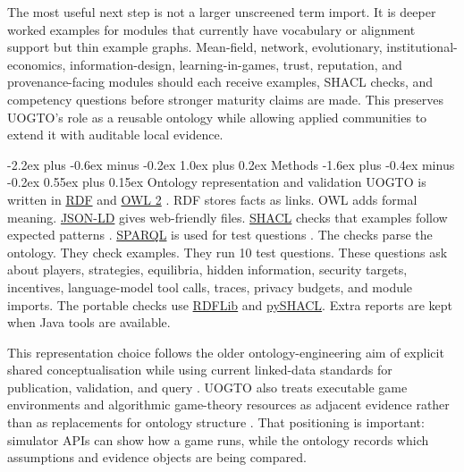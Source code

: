 \documentclass[11pt]{article}
\makeatletter
\renewcommand\section{\@startsection{section}{1}{\z@}%
  {-2.2ex plus -0.6ex minus -0.2ex}%
  {1.0ex plus 0.2ex}%
  {\normalfont\Large\bfseries\color{uogtoInk}}}
\renewcommand\subsection{\@startsection{subsection}{2}{\z@}%
  {-1.6ex plus -0.4ex minus -0.2ex}%
  {0.55ex plus 0.15ex}%
  {\normalfont\large\bfseries\color{uogtoInk}}}
\newcommand{\abblink}[2]{\hyperlink{abbr:#1}{#2}}
\makeatother
\begin{document}
The most useful next step is not a larger unscreened term import. It is deeper worked examples for modules that currently have vocabulary or alignment support but thin example graphs. Mean-field, network, evolutionary, institutional-economics, information-design, learning-in-games, trust, reputation, and provenance-facing modules should each receive examples, SHACL checks, and competency questions before stronger maturity claims are made. This preserves UOGTO's role as a reusable ontology while allowing applied communities to extend it with auditable local evidence.

\section{Methods}
\subsection{Ontology representation and validation}
UOGTO is written in \abblink{rdf}{RDF} and \abblink{owl}{OWL 2} \cite{w3c-rdf11-concepts,w3c-owl2-overview}. RDF stores facts as links. OWL adds formal meaning. \abblink{jsonld}{JSON-LD} gives web-friendly files. \abblink{shacl}{SHACL} checks that examples follow expected patterns \cite{w3c-json-ld11,w3c-shacl}. \abblink{sparql}{SPARQL} is used for test questions \cite{w3c-sparql11-query}. The checks parse the ontology. They check examples. They run 10 test questions. These questions ask about players, strategies, equilibria, hidden information, security targets, incentives, language-model tool calls, traces, privacy budgets, and module imports. The portable checks use \abblink{rdflib}{RDFLib} and \abblink{pyshacl}{pySHACL}. Extra reports are kept when Java tools are available.

This representation choice follows the older ontology-engineering aim of explicit shared conceptualisation while using current linked-data standards for publication, validation, and query \cite{gruber-1995,w3c-rdf11-concepts,w3c-owl2-overview,w3c-shacl,w3c-json-ld11,w3c-sparql11-query}. UOGTO also treats executable game environments and algorithmic game-theory resources as adjacent evidence rather than as replacements for ontology structure \cite{nisan-2007,open-spiel-2019}. That positioning is important: simulator APIs can show how a game runs, while the ontology records which assumptions and evidence objects are being compared.
\end{document}
